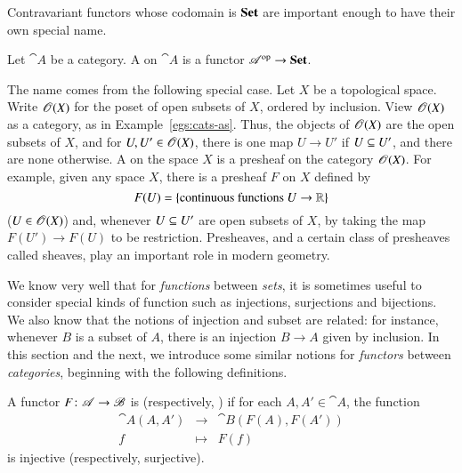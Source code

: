Contravariant functors whose codomain is $\mathbf{Set}$ are important enough to have
their own special name.

\begin{defn}    
\label{defn:presheaf}
Let $\cat{A}$ be a category.  A %
%
%
on $\cat{A}$ is a functor $\mathscr{A}^{\mathrm{op}} \to \mathbf{Set}$.
\end{defn}

The name comes from the following special case.  Let $X$ be a topological
space.  Write $\operatorname{\mathscr{O}}(X)$%
%
%
for the poset of open subsets of $X$, ordered by inclusion.  View
$\operatorname{\mathscr{O}}(X)$ as a category, as in
Example~\ref{egs:cats-as}.  Thus, the objects of
$\operatorname{\mathscr{O}}(X)$ are the open subsets of $X$, and for $U, U' \in \operatorname{\mathscr{O}}(X)$, there
is one map $U \to U'$ if $U \subseteq U'$, and there are none otherwise.  A
 on the space $X$ is a presheaf on the category $\operatorname{\mathscr{O}}(X)$.
For example, given any space $X$, there is a presheaf $F$ on $X$ defined by
\[
F(U) = \{ \text{continuous functions } U \to \reals \}
%
\index{topological space!functions on}
%
\]
($U \in \operatorname{\mathscr{O}}(X)$) and, whenever $U \subseteq U'$ are open subsets of $X$, by
taking the map $F(U') \to F(U)$ to be restriction.  Presheaves, and a
certain class of presheaves called sheaves,%
%
%
play an important role in modern geometry.%
%
%

\subjectchange

We know very well that for \emph{functions} between \emph{sets}, it is
sometimes useful to consider special kinds of function such as injections,
surjections and bijections.  We also know that the notions of injection and
subset are related: for instance, whenever $B$ is a subset of $A$, there is
an injection $B \to A$ given by inclusion.  In this section and the next,
we introduce some similar notions for \emph{functors} between
\emph{categories}, beginning with the following definitions.

\begin{defn}
A functor $F\from  \cat{A} \to \cat{B}$ is %
%
%
%
(respectively, )%
%
%
if for each $A, A' \in \cat{A}$, the function
\[
\begin{array}{ccc}
\cat{A}(A, A')  &\to            &\cat{B}(F(A), F(A'))   \\
f               &\mapsto        &F(f)
\end{array}
\]
is injective (respectively, surjective).
\end{defn}

